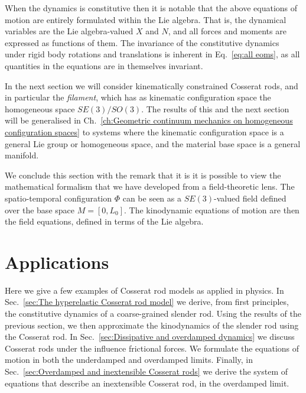 When the dynamics is constitutive then it is notable that the above equations of motion are entirely formulated within the Lie algebra. That is, the dynamical variables are the Lie algebra-valued $X$ and $N$, and all forces and moments are expressed as functions of them. The invariance of the constitutive dynamics under rigid body rotations and translations is inherent in Eq.~\ref{eq:all eoms}, as all quantities in the equations are in themselves invariant.

In the next section we will consider kinematically constrained Cosserat rods, and in particular the \textit{filament}, which has as kinematic configuration space the homogeneous space $SE(3)/SO(3)$. The results of this and the next section will be generalised in Ch.~\ref{ch:Geometric continuum mechanics on homogeneous configuration spaces} to systems where the kinematic configuration space is a general Lie group or homogeneous space, and the material base space is a general manifold.

We conclude this section with the remark that it is it is possible to view the mathematical formalism that we have developed from a field-theoretic lens. The spatio-temporal configuration $\Phi$ can be seen as a $SE(3)$-valued field defined over the base space $M = [0, L_0]$. The kinodynamic equations of motion are then the field equations, defined in terms of the Lie algebra.


\section{Applications} \label{sec:cosserat rod applications}

Here we give a few examples of Cosserat rod models as applied in physics. In Sec.~\ref{sec:The hyperelastic Cosserat rod model} we derive, from first principles, the constitutive dynamics of a coarse-grained slender rod. Using the results of the previous section, we then approximate the kinodynamics of the slender rod using the Cosserat rod. In Sec.~\ref{sec:Dissipative and overdamped dynamics} we discuss Cosserat rods under the influence frictional forces. We formulate the equations of motion in both the underdamped and overdamped limits. Finally, in Sec.~\ref{sec:Overdamped and inextensible Cosserat rods} we derive the system of equations that describe an inextensible Cosserat rod, in the overdamped limit.


